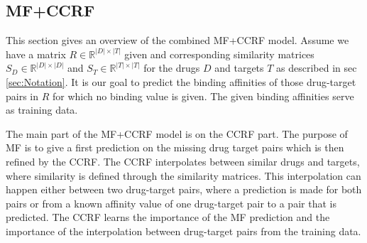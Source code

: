 \subsection{MF+CCRF}
\label{sec:MFCCRF}

This section gives an overview of the combined MF+CCRF model. Assume we have a matrix $R \in \mathbb{R} ^{|D| \times |T|}$ given and corresponding similarity matrices $S_D \in \mathbb{R}^{|D| \times |D|}$ and $S_T \in \mathbb{R}^{|T| \times |T|}$ for the drugs $D$ and targets $T$ as described in sec \ref{sec:Notation}. It is our goal to predict the binding affinities of those drug-target pairs in $R$ for which no binding value is given. The given binding affinities serve as training data.

The main part of the MF+CCRF model is on the CCRF part. The purpose of MF is to give a first prediction on the missing drug target pairs which is then refined by the CCRF. The CCRF interpolates between similar drugs and targets, where similarity is defined through the similarity matrices. This interpolation can happen either between two drug-target pairs, where a prediction is made for both pairs or from a known affinity value of one drug-target pair to a pair that is predicted. The CCRF learns the importance of the MF prediction and the importance of the interpolation between drug-target pairs from the training data.
